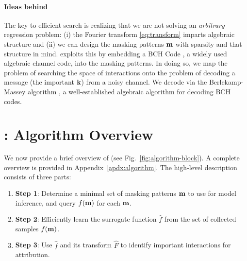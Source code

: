 
\vspace{-5pt}
\paragraph{Ideas behind \SpecExp{}} The key to efficient search is realizing that we are not solving an \emph{arbitrary} regression problem: (i) the Fourier transform \eqref{eq:transform} imparts algebraic structure and (ii) we can design the masking patterns $\mathbf m$ with sparsity and that structure in mind. 
%
\SpecExp{} exploits this by embedding a BCH Code \cite{Lin1999}, a widely used algebraic channel code, into the masking patterns.
%
In doing so, we map the problem of searching the space of interactions onto the problem of decoding a message (the important $\mathbf k$) from a noisy channel.
%
We decode via the Berlekamp-Massey algorithm \cite{massey1969shift}, a well-established algebraic algorithm for decoding BCH codes.

\section{\SpecExp: Algorithm Overview}
\label{sec:method}

We now provide a brief overview of \SpecExp{} (see Fig.~\ref{fig:algorithm-block}). A complete overview is provided in Appendix~\ref{apdx:algorithm}. The high-level description consists of three parts:
\begin{enumerate}[label={}, topsep=0pt, itemsep=0pt, leftmargin=*]
    \item {\bfseries Step 1}: Determine a minimal set of masking patterns $\mathbf m$ to use for model inference, and query $f(\mathbf m)$ for each $\mathbf m$.
    \item {\bfseries Step 2}: Efficiently learn the surrogate function $\hat{f}$ from the set of collected samples $f(\mathbf m)$. 
    \item {\bfseries Step 3}: Use $\hat{f}$ and its transform $\hat{F}$ to identify important interactions for attribution.
\end{enumerate}

